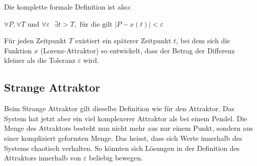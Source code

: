 Die komplette formale Definition ist also:

\begin{center}\label{Attraktor}
$\forall P, \forall T \text{ und } \forall \varepsilon \text{ } \exists t > T , \text{ für die gilt } |P - x(t) |< \varepsilon$
\end{center}

Für jeden Zeitpunkt $T$ existiert ein späterer Zeitpunkt $t$, bei dem sich die Funktion $x$ (Lorenz-Attraktor) so entwickelt, dass der Betrag der Differenz kleiner als die Toleranz $\varepsilon$ wird. 


\subsection{Strange Attraktor}
Beim Strange Attraktor gilt dieselbe Definition wie für den Attraktor. Das System hat jetzt aber ein viel komplexerer Attraktor als bei einem Pendel. Die Menge des Attraktors besteht nun nicht mehr aus nur einem Punkt, sondern aus einer kompliziert geformten Menge. Das heisst, dass sich Werte innerhalb des Systems chaotisch verhalten. So könnten sich Lösungen in der Definition des Attraktors innerhalb von $\varepsilon$ beliebig bewegen. 